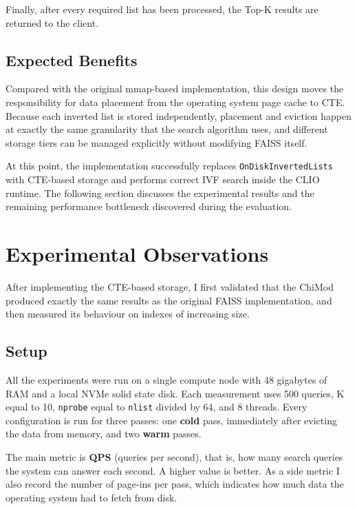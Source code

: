 \documentclass[11pt]{article}
\begin{document}
Finally, after every required list has been processed, the Top-K
results are returned to the client.

\subsection{Expected Benefits}

Compared with the original mmap-based implementation, this design
moves the responsibility for data placement from the operating system
page cache to CTE. Because each inverted list is stored independently,
placement and eviction happen at exactly the same granularity that the
search algorithm uses, and different storage tiers can be managed
explicitly without modifying FAISS itself.

At this point, the implementation successfully replaces
\texttt{OnDiskInvertedLists} with CTE-based storage and performs
correct IVF search inside the CLIO runtime. The following section
discusses the experimental results and the remaining performance
bottleneck discovered during the evaluation.

\section{Experimental Observations}

After implementing the CTE-based storage, I first validated that the
ChiMod produced exactly the same results as the original FAISS
implementation, and then measured its behaviour on indexes of
increasing size.

\subsection{Setup}

All the experiments were run on a single compute node with 48
gigabytes of RAM and a local NVMe solid state disk. Each measurement
uses 500 queries, K equal to 10, \texttt{nprobe} equal to
\texttt{nlist} divided by 64, and 8 threads. Every configuration is
run for three passes: one \textbf{cold} pass, immediately after
evicting the data from memory, and two \textbf{warm} passes.

The main metric is \textbf{QPS} (queries per second), that is, how
many search queries the system can answer each second. A higher value
is better. As a side metric I also record the number of page-ins per
pass, which indicates how much data the operating system had to fetch
from disk.
\end{document}

